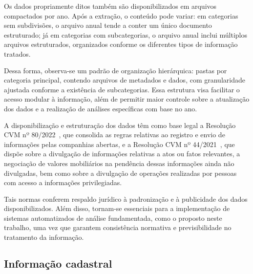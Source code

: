 Os dados propriamente ditos também são disponibilizados em arquivos compactados por ano. Após a extração, o conteúdo pode variar: em categorias sem subdivisões, o arquivo anual tende a conter um único documento estruturado; já em categorias com subcategorias, o arquivo anual inclui múltiplos arquivos estruturados, organizados conforme os diferentes tipos de informação tratados.

Dessa forma, observa-se um padrão de organização hierárquica: pastas por categoria principal, contendo arquivos de metadados e dados, com granularidade ajustada conforme a existência de subcategorias. Essa estrutura visa facilitar o acesso modular à informação, além de permitir maior controle sobre a atualização dos dados e a realização de análises específicas com base no ano.

A disponibilização e estruturação dos dados têm como base legal a Resolução CVM nº 80/2022~\cite{cvm:2022:resolucao80}, que consolida as regras relativas ao registro e envio de informações pelas companhias abertas, e a Resolução CVM nº 44/2021~\cite{cvm:2021:resolucao44}, que dispõe sobre a divulgação de informações relativas a atos ou fatos relevantes, a negociação de valores mobiliários na pendência dessas informações ainda não divulgadas, bem como sobre a divulgação de operações realizadas por pessoas com acesso a informações privilegiadas.

Tais normas conferem respaldo jurídico à padronização e à publicidade dos dados disponibilizados. Além disso, tornam-se essenciais para a implementação de sistemas automatizados de análise fundamentada, como o proposto neste trabalho, uma vez que garantem consistência normativa e previsibilidade no tratamento da informação.



\subsection{Informação cadastral} 


